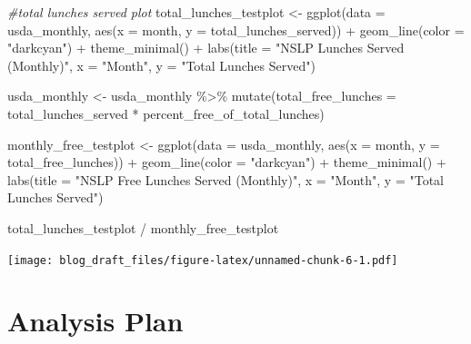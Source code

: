 \documentclass[
]{article}
\newenvironment{Shaded}{\begin{snugshade}}{\end{snugshade}}
\newcommand{\AttributeTok}[1]{\textcolor[rgb]{0.77,0.63,0.00}{#1}}
\newcommand{\CommentTok}[1]{\textcolor[rgb]{0.56,0.35,0.01}{\textit{#1}}}
\newcommand{\FunctionTok}[1]{\textcolor[rgb]{0.00,0.00,0.00}{#1}}
\newcommand{\NormalTok}[1]{#1}
\newcommand{\OtherTok}[1]{\textcolor[rgb]{0.56,0.35,0.01}{#1}}
\newcommand{\SpecialCharTok}[1]{\textcolor[rgb]{0.00,0.00,0.00}{#1}}
\newcommand{\StringTok}[1]{\textcolor[rgb]{0.31,0.60,0.02}{#1}}
\begin{document}
\begin{Shaded}
\begin{Highlighting}[]
\CommentTok{\#total lunches served plot }
\NormalTok{total\_lunches\_testplot }\OtherTok{\textless{}{-}} \FunctionTok{ggplot}\NormalTok{(}\AttributeTok{data =}\NormalTok{ usda\_monthly, }\FunctionTok{aes}\NormalTok{(}\AttributeTok{x =}\NormalTok{ month, }\AttributeTok{y =}\NormalTok{ total\_lunches\_served)) }\SpecialCharTok{+}
  \FunctionTok{geom\_line}\NormalTok{(}\AttributeTok{color =} \StringTok{"darkcyan"}\NormalTok{) }\SpecialCharTok{+}
  \FunctionTok{theme\_minimal}\NormalTok{() }\SpecialCharTok{+}
  \FunctionTok{labs}\NormalTok{(}\AttributeTok{title =} \StringTok{"NSLP Lunches Served (Monthly)"}\NormalTok{,}
       \AttributeTok{x =} \StringTok{"Month"}\NormalTok{,}
       \AttributeTok{y =} \StringTok{"Total Lunches Served"}\NormalTok{)}

\NormalTok{usda\_monthly }\OtherTok{\textless{}{-}}\NormalTok{ usda\_monthly }\SpecialCharTok{\%\textgreater{}\%} 
  \FunctionTok{mutate}\NormalTok{(}\AttributeTok{total\_free\_lunches =}\NormalTok{ total\_lunches\_served }\SpecialCharTok{*}\NormalTok{ percent\_free\_of\_total\_lunches)}

\NormalTok{monthly\_free\_testplot }\OtherTok{\textless{}{-}} \FunctionTok{ggplot}\NormalTok{(}\AttributeTok{data =}\NormalTok{ usda\_monthly, }\FunctionTok{aes}\NormalTok{(}\AttributeTok{x =}\NormalTok{ month, }\AttributeTok{y =}\NormalTok{ total\_free\_lunches)) }\SpecialCharTok{+}
  \FunctionTok{geom\_line}\NormalTok{(}\AttributeTok{color =} \StringTok{"darkcyan"}\NormalTok{) }\SpecialCharTok{+}
  \FunctionTok{theme\_minimal}\NormalTok{() }\SpecialCharTok{+}
  \FunctionTok{labs}\NormalTok{(}\AttributeTok{title =} \StringTok{"NSLP Free Lunches Served (Monthly)"}\NormalTok{,}
       \AttributeTok{x =} \StringTok{"Month"}\NormalTok{,}
       \AttributeTok{y =} \StringTok{"Total Lunches Served"}\NormalTok{)}

\NormalTok{total\_lunches\_testplot }\SpecialCharTok{/}\NormalTok{ monthly\_free\_testplot}
\end{Highlighting}
\end{Shaded}

\texttt{[image: blog\_draft\_files/figure-latex/unnamed-chunk-6-1.pdf]}

\hypertarget{analysis-plan}{%
\section{Analysis Plan}\label{analysis-plan}}
\end{document}
